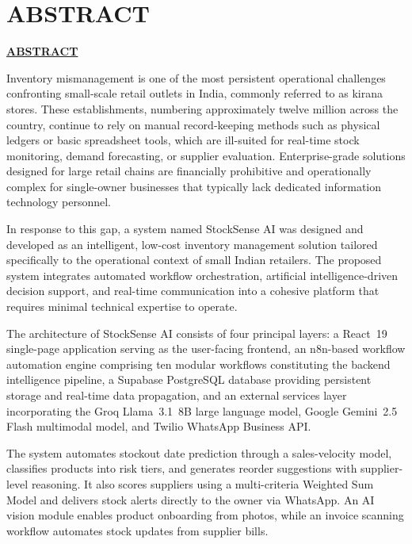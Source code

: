 \chapter*{ABSTRACT}
{\centering\fontsize{14}{18}\bfseries\underline{ABSTRACT}\par}
\vspace{0.8cm}

Inventory mismanagement is one of the most persistent operational challenges confronting small-scale
retail outlets in India, commonly referred to as kirana stores. These establishments, numbering
approximately twelve million across the country, continue to rely on manual record-keeping methods
such as physical ledgers or basic spreadsheet tools, which are ill-suited for real-time stock
monitoring, demand forecasting, or supplier evaluation. Enterprise-grade solutions designed for
large retail chains are financially prohibitive and operationally complex for single-owner
businesses that typically lack dedicated information technology personnel.

In response to this gap, a system named StockSense AI was designed and developed as an
intelligent, low-cost inventory management solution tailored specifically to the operational
context of small Indian retailers. The proposed system integrates automated workflow orchestration,
artificial intelligence-driven decision support, and real-time communication into a cohesive
platform that requires minimal technical expertise to operate.

The architecture of StockSense AI consists of four principal layers: a React~19 single-page
application serving as the user-facing frontend, an n8n-based workflow automation engine
comprising ten modular workflows constituting the backend intelligence pipeline, a Supabase
PostgreSQL database providing persistent storage and real-time data propagation, and an external
services layer incorporating the Groq Llama~3.1~8B large language model, Google Gemini~2.5
Flash multimodal model, and Twilio WhatsApp Business API.

The system automates stockout date prediction through a sales-velocity model, classifies products into risk tiers, and generates reorder suggestions with supplier-level reasoning. It also scores suppliers using a multi-criteria Weighted Sum Model and delivers stock alerts directly to the owner via WhatsApp. An AI vision module enables product onboarding from photos, while an invoice scanning workflow automates stock updates from supplier bills.

